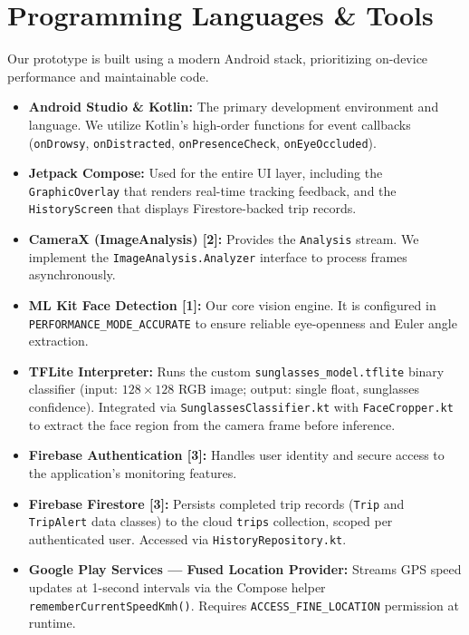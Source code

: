 \documentclass[11pt]{report}
\begin{document}
\section{Programming Languages \& Tools}\label{sec:prog-tools}

Our prototype is built using a modern Android stack, prioritizing on-device performance and maintainable code.

\begin{itemize}
    \item \textbf{Android Studio \& Kotlin:} The primary development environment and language. We utilize Kotlin's high-order functions for event callbacks (\texttt{onDrowsy}, \texttt{onDistracted}, \texttt{onPresenceCheck}, \texttt{onEyeOccluded}).
    \item \textbf{Jetpack Compose:} Used for the entire UI layer, including the \texttt{GraphicOverlay} that renders real-time tracking feedback, and the \texttt{HistoryScreen} that displays Firestore-backed trip records.
    \item \textbf{CameraX (ImageAnalysis) [2]:} Provides the \texttt{Analysis} stream. We implement the \texttt{ImageAnalysis.Analyzer} interface to process frames asynchronously.
    \item \textbf{ML Kit Face Detection [1]:} Our core vision engine. It is configured in \texttt{PERFORMANCE\_MODE\_ACCURATE} to ensure reliable eye-openness and Euler angle extraction.
    \item \textbf{TFLite Interpreter:} Runs the custom \texttt{sunglasses\_model.tflite} binary classifier (input: $128 \times 128$ RGB image; output: single float, sunglasses confidence). Integrated via \texttt{SunglassesClassifier.kt} with \texttt{FaceCropper.kt} to extract the face region from the camera frame before inference.
    \item \textbf{Firebase Authentication [3]:} Handles user identity and secure access to the application's monitoring features.
    \item \textbf{Firebase Firestore [3]:} Persists completed trip records (\texttt{Trip} and \texttt{TripAlert} data classes) to the cloud \texttt{trips} collection, scoped per authenticated user. Accessed via \texttt{HistoryRepository.kt}.
    \item \textbf{Google Play Services — Fused Location Provider:} Streams GPS speed updates at 1-second intervals via the Compose helper \texttt{rememberCurrentSpeedKmh()}. Requires \texttt{ACCESS\_FINE\_LOCATION} permission at runtime.
\end{itemize}
\end{document}
